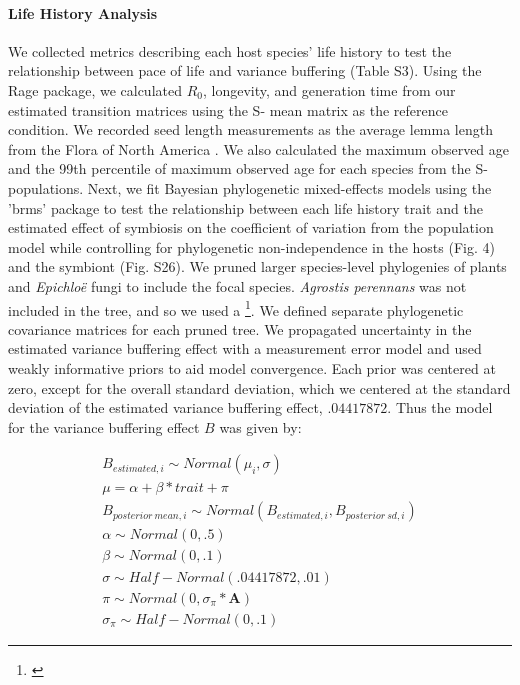 \documentclass[12pt]{article}
\newcommand{\tom}[2]{{\color{red}{#1}}\footnote{\textit{\color{red}{#2}}}}
\begin{document}
\paragraph*{Life History Analysis}
We collected metrics describing each host species' life history to test the relationship between pace of life and variance buffering (Table S3). 
Using the Rage package, we calculated $R_0$, longevity, and generation time from our estimated transition matrices using the S- mean matrix as the reference condition.
We recorded seed length measurements as the average lemma length from the Flora of North America \cite{FloraNAonline}. 
We also calculated the maximum observed age and the 99th percentile of maximum observed age for each species from the S- populations.
Next, we fit Bayesian phylogenetic mixed-effects models using the 'brms' package \cite{Burkner2017brms} to test the relationship between each life history trait and the estimated effect of symbiosis on the coefficient of variation from the population model while controlling for phylogenetic non-independence in the hosts (Fig. 4) and the symbiont (Fig. S26).
We pruned larger species-level phylogenies of plants\cite{zanne2014three} and \emph{Epichlo\"{e}} fungi \cite{leuchtmann2014nomenclatural} to include the focal species.
\emph{Agrostis perennans} was not included in the tree, and so we used a \tom{congeneric species}{which one?}. 
We defined separate phylogenetic covariance matrices for each pruned tree.
We propagated uncertainty in the estimated variance buffering effect with a measurement error model and used weakly informative priors to aid model convergence.
Each prior was centered at zero, except for the overall standard deviation, which we centered at the standard deviation of the estimated variance buffering effect, $.04417872$.
Thus the model for the variance buffering effect $B$ was given by:


\begin{subequations}
	\begin{align}
		B_{estimated,i} \sim Normal(\mu_i,\sigma)\\
		\mu = \alpha + \beta*trait + \pi \\
		B_{posterior\ mean,i} \sim Normal(B_{estimated,i}, B_{posterior\ sd,i})\\
		\alpha \sim Normal(0,.5)\\
		\beta \sim Normal(0,.1)\\
		\sigma \sim Half-Normal(.04417872,.01)\\
		\pi \sim Normal(0,\sigma_{\pi}*\mathbf{A})\\
		\sigma_{\pi} \sim Half-Normal(0,.1)
	\end{align}
\end{subequations}
\end{document}
